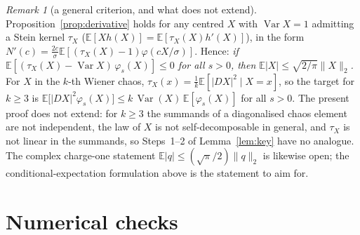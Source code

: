 \documentclass[11pt]{article}
\theoremstyle{remark}
\newtheorem{remark}[theorem]{Remark}
\newcommand{\E}{\mathbb{E}}
\newcommand{\Var}{\operatorname{Var}}
\begin{document}
\begin{remark}[a general criterion, and what does not extend]
Proposition~\ref{prop:derivative} holds for any centred $X$ with $\Var X=1$ admitting a Stein kernel $\tau_X$ ($\E[Xh(X)]=\E[\tau_X(X)h'(X)]$),
in the form $N'(c)=\tfrac{2c}\sigma\E[(\tau_X(X)-1)\varphi(cX/\sigma)]$. Hence: \emph{if $\E[(\tau_X(X)-\Var X)\,\varphi_s(X)]\le0$ for all $s>0$, then
$\E|X|\le\sqrt{2/\pi}\|X\|_2$.} For $X$ in the $k$-th Wiener chaos, $\tau_X(x)=\frac1k\E[|DX|^2\mid X=x]$, so the target for $k\ge3$ is
$\E\big[|DX|^2\varphi_s(X)\big]\le k\,\Var(X)\,\E[\varphi_s(X)]$ for all $s>0$. The present proof does not extend: for $k\ge3$ the summands of a
diagonalised chaos element are not independent, the law of $X$ is not self-decomposable in general, and $\tau_X$ is not linear in the summands,
so Steps~1--2 of Lemma~\ref{lem:key} have no analogue. The complex charge-one statement $\E|q|\le(\sqrt\pi/2)\|q\|_2$ is likewise open; the
conditional-expectation formulation above is the statement to aim for.
\end{remark}

\appendix
\section{Numerical checks}
\end{document}
